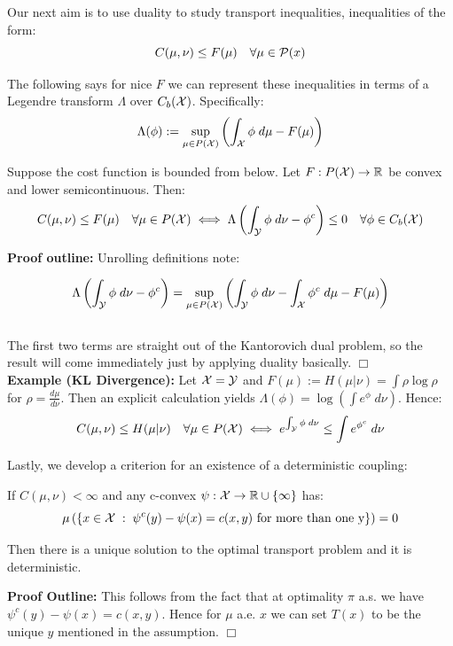 \noindent Our next aim is to use duality to study transport inequalities, inequalities of the form:
%
\[C(\mu, \nu) \leq F(\mu) \quad \forall \mu \in {\mathcal P}(x)\]

\noindent The following says for nice $F$ we can represent these inequalities in terms of a Legendre transform $\Lambda$ over $C_b({\mathcal X})$. Specifically:
%
\[\Lambda(\phi) := \sup_{\mu \in P({\mathcal X})} \left( \int_{\mathcal X} \phi \;d\mu - F(\mu)\right)\]
\begin{thm} Suppose the cost function is bounded from below. Let $F:P({\mathcal X}) \to \mathbb{R}$ be convex and lower semicontinuous. Then:
\[C(\mu, \nu) \leq F(\mu) \quad \forall \mu \in P({\mathcal X}) \iff\Lambda\left(\int_{\mathcal Y} \phi \; d\nu - \phi^c\right) \leq 0 \quad \forall \phi \in C_b({\mathcal X})\]
\end{thm}

\noindent \textbf{Proof outline:} Unrolling definitions note:

\[\Lambda\left(\int_{\mathcal Y} \phi \; d\nu - \phi^c\right) = \sup_{\mu \in P({\mathcal X})}\left(\int_{\mathcal Y} \phi \; d\nu - \int_{\mathcal X} \phi^c \; d\mu - F(\mu)\right)\]\\
%
\noindent The first two terms are straight out of the Kantorovich dual problem, so the result will come immediately just by applying duality basically. $\Box$\\



\noindent \textbf{Example (KL Divergence): } Let ${\mathcal X} = {\mathcal Y}$ and $F(\mu) := H(\mu | \nu) = \int \rho \log \rho$ for $\rho = \frac{d \mu}{d\nu}$. Then an explicit calculation yields $\Lambda(\phi) = \log \left( \int e^\phi \; d\nu \right)$. Hence:
%
\[C(\mu, \nu) \leq H(\mu | \nu) \quad \forall \mu \in P({\mathcal X}) \iff e^{\int_{\mathcal Y} \phi \; d\nu} \leq \int e^{\phi^c} \; d\nu\]

\noindent Lastly, we develop a criterion for an existence of a deterministic coupling:

\begin{thm}
\noindent If $C(\mu, \nu) < \infty$ and any c-convex $\psi:{\mathcal X} \to \mathbb{R} \cup \{\infty\}$ has:
%
\[ \mu\left( \{ x \in {\mathcal X} \; : \; \psi^c(y) - \psi(x) = c(x,y) \text{ for more than one y} \} \right) = 0\]

\noindent Then there is a unique solution to the optimal transport problem and it is deterministic.
\label{thm:deterministic_coupling}
\end{thm}

\noindent \textbf{Proof Outline:} This follows from the fact that at optimality $\pi$ a.s. we have $\psi^c(y) - \psi(x) = c(x,y)$. Hence for $\mu$ a.e. $x$ we can set $T(x)$ to be the unique $y$ mentioned in the assumption. $\Box$\\

